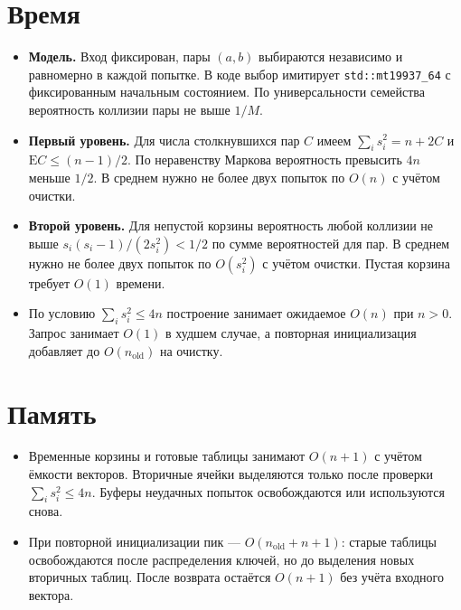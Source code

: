 \documentclass[12pt,a4paper]{article}
\begin{document}
\section*{Время}
\begin{itemize}
  \setlength{\topsep}{3pt}
  \setlength{\itemsep}{0pt}
  \item \textbf{Модель.} Вход фиксирован, пары $(a,b)$ выбираются независимо и равномерно в каждой попытке.
    В коде выбор имитирует \texttt{std::mt19937\_64} с фиксированным начальным состоянием.
    По универсальности семейства вероятность коллизии пары не выше $1/M$.
  \item \textbf{Первый уровень.} Для числа столкнувшихся пар $C$ имеем $\sum_i s_i^2=n+2C$ и
    $\mathrm{E}C\le(n-1)/2$.
    По неравенству Маркова вероятность превысить $4n$ меньше $1/2$.
    В среднем нужно не более двух попыток по $O(n)$ с учётом очистки.
  \item \textbf{Второй уровень.} Для непустой корзины вероятность любой коллизии не выше
    $s_i(s_i-1)/(2s_i^2)<1/2$ по сумме вероятностей для пар.
    В среднем нужно не более двух попыток по $O(s_i^2)$ с учётом очистки.
    Пустая корзина требует $O(1)$ времени.
  \item По условию $\sum_i s_i^2\le4n$ построение занимает ожидаемое $O(n)$ при $n>0$.
    Запрос занимает $O(1)$ в худшем случае, а повторная инициализация добавляет до $O(n_{\mathrm{old}})$ на очистку.
\end{itemize}

\section*{Память}
\begin{itemize}
  \setlength{\topsep}{3pt}
  \setlength{\itemsep}{0pt}
  \item Временные корзины и готовые таблицы занимают $O(n+1)$ с учётом ёмкости векторов.
    Вторичные ячейки выделяются только после проверки $\sum_i s_i^2\le4n$.
    Буферы неудачных попыток освобождаются или используются снова.
  \item При повторной инициализации пик --- $O(n_{\mathrm{old}}+n+1)$:
    старые таблицы освобождаются после распределения ключей, но до выделения новых вторичных таблиц.
    После возврата остаётся $O(n+1)$ без учёта входного вектора.
\end{itemize}
\end{document}
